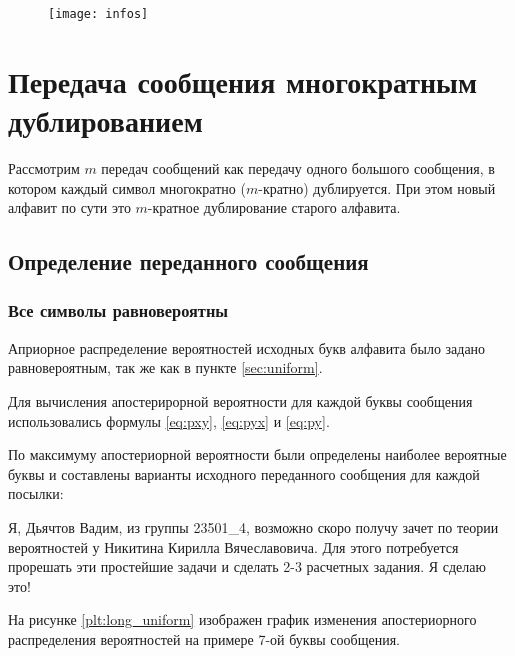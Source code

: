 \begin{figure}[H]
\begin{center}
	\vspace{-0.5cm}
	\texttt{[image: infos]}
	\caption{}
	\label{plt:info}
	\vspace{-0.5cm}
\end{center}
\end{figure}

\section{Передача сообщения многократным дублированием}

Рассмотрим $m$ передач сообщений как передачу одного большого сообщения, в котором каждый символ многократно ($m$-кратно) дублируется. При этом новый алфавит по сути это $m$-кратное дублирование старого алфавита.

\subsection{Определение переданного сообщения}

\subsubsection{Все символы равновероятны}

Априорное распределение вероятностей исходных букв алфавита было задано равновероятным, так же как в пункте \ref{sec:uniform}.

Для вычисления апостерирорной вероятности для каждой буквы сообщения использовались формулы \ref{eq:pxy}, \ref{eq:pyx} и \ref{eq:py}.

По максимуму апостериорной вероятности были определены наиболее вероятные буквы и составлены варианты исходного переданного сообщения для каждой посылки:

\vspace{0.5cm}
{ \scriptsize

Я, Дьячтов Вадим, из группы 23501\_4, возможно скоро получу зачет по теории вероятностей у Никитина Кирилла Вячеславовича. Для этого потребуется прорешать эти простейшие задачи и сделать 2-3 расчетных задания. Я сделаю это!

}
\vspace{0.5cm}

На рисунке \ref{plt:long_uniform} изображен график изменения апостериорного распределения вероятностей на примере 7-ой буквы сообщения.

